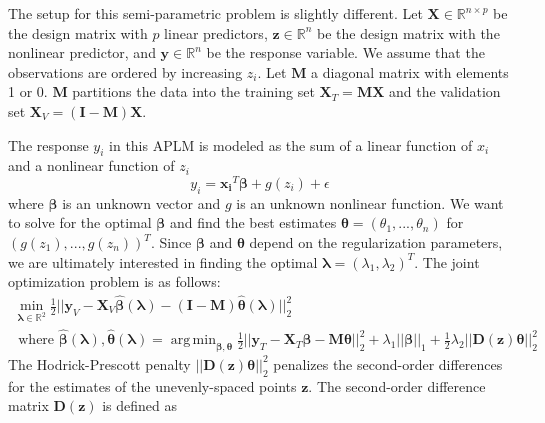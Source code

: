 \documentclass[10pt,letterpaper]{article}
\DeclareMathOperator*{\argmin}{arg\,min}
\begin{document}
The setup for this semi-parametric problem is slightly different. Let $\boldsymbol{X} \in \mathbb{R}^{n \times p}$ be the design matrix with $p$ linear predictors, $\boldsymbol{z} \in \mathbb{R}^n$ be the design matrix with the nonlinear predictor, and $\boldsymbol{y} \in \mathbb{R}^n$ be the response variable. We assume that the observations are ordered by increasing $z_i$. Let $\boldsymbol{M}$ a diagonal matrix with elements 1 or 0. $\boldsymbol{M}$ partitions the data into the training set $\boldsymbol{X}_T= \boldsymbol{M} \boldsymbol{X}$ and the validation set $\boldsymbol{X}_V= (\boldsymbol{I} - \boldsymbol{M}) \boldsymbol{X}$.

The response $y_i$ in this APLM is modeled as the sum of a linear function of $x_i$ and a nonlinear function of $z_i$
\begin{equation}
y_i = \boldsymbol{x_i}^T \boldsymbol{\beta} + g(z_i) + \epsilon
\end{equation}
where $\boldsymbol \beta$ is an unknown vector and $g$ is an unknown nonlinear function. We want to solve for the optimal $\boldsymbol{\beta}$ and find the best estimates $\boldsymbol{\theta} = (\theta_1, ..., \theta_n)$ for $(g(z_1), ..., g(z_n))^T$. Since $\boldsymbol{\beta}$ and $\boldsymbol{\theta}$ depend on the regularization parameters, we are ultimately interested in finding the optimal $\boldsymbol\lambda = (\lambda_1, \lambda_2)^T$. The joint optimization problem is as follows:
\begin{equation}
\begin{array}{c}
\min_{\boldsymbol\lambda \in \mathbb{R}^2} \frac{1}{2}
\bigl\lvert\bigl\lvert
\boldsymbol{y}_V
- \boldsymbol{X}_V\hat{\boldsymbol{\beta}}(\boldsymbol{\lambda})
- (\boldsymbol{I} - \boldsymbol{M}) \hat{\boldsymbol{\theta}}(\boldsymbol{\lambda})
\bigl\rvert\bigl\rvert^2_2 \\
\text{ where }
\hat{\boldsymbol{\beta}}(\boldsymbol{\lambda}),
\hat{\boldsymbol{\theta}}(\boldsymbol{\lambda}) =
\argmin_{\boldsymbol{\beta}, \boldsymbol{\theta}}
\frac{1}{2} \bigl\lvert\bigl\lvert
\boldsymbol{y}_T
- \boldsymbol{X}_T\boldsymbol{\beta}
- \boldsymbol{M} \boldsymbol{\theta} \bigl\rvert\bigl\rvert^2_2
+ \lambda_1 \lvert\lvert \boldsymbol{\beta}
\rvert \rvert_1
+ \frac{1}{2} \lambda_2 \lvert\lvert \boldsymbol{D}(\boldsymbol{z}) \boldsymbol{\theta} \rvert \rvert_2^2
\end{array}
\label{aplmProblem}
\end{equation}
The Hodrick-Prescott penalty $\lvert\lvert \boldsymbol{D}(\boldsymbol{z}) \boldsymbol{\theta} \rvert \rvert_2^2$ penalizes the second-order differences for the estimates of the unevenly-spaced points $\boldsymbol{z}$. The second-order difference matrix $\boldsymbol{D}(\boldsymbol{z})$ is defined as
\end{document}
